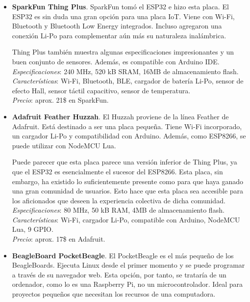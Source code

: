 \documentclass[12pt]{article}
\begin{document}
\begin{itemize}
		\item \textbf{SparkFun Thing Plus}. SparkFun tomó el ESP32 e hizo esta placa. El ESP32 es sin duda una gran opción para una placa IoT. Viene con Wi-Fi, Bluetooth y Bluetooth Low Energy integrados. Incluso agregaron una conexión Li-Po para complementar aún más su naturaleza inalámbrica.
		
		Thing Plus también muestra algunas especificaciones impresionantes y un buen conjunto de sensores. Además, es compatible con Arduino IDE. \\
		
		\textit{Especificaciones}: 240 MHz, 520 kB SRAM, 16MB de almacenamiento flash. \\
		
		\textit{Características}: Wi-Fi, Bluetooth, BLE, cargador de batería Li-Po, sensor de efecto Hall, sensor táctil capacitivo, sensor de temperatura. \\
		
		\textit{Precio}: aprox. 21\$ en SparkFun.\\
		
		\item \textbf{Adafruit Feather Huzzah}. El Huzzah proviene de la línea Feather de Adafruit. Está destinado a ser una placa pequeña. Tiene Wi-Fi incorporado, un cargador Li-Po y compatibilidad con Arduino. Además, como ESP8266, se puede utilizar con NodeMCU Lua.
		
		Puede parecer que esta placa parece una versión inferior de Thing Plus, ya que el ESP32 es esencialmente el sucesor del ESP8266. Esta placa, sin embargo, ha existido lo suficientemente presente como para que haya ganado una gran comunidad de usuarios. Esto hace que esta placa sea accesible para los aficionados que deseen la experiencia colectiva de dicha comunidad. \\
		
		\textit{Especificaciones}: 80 MHz, 50 kB RAM, 4MB de almacenamiento flash. \\
		
		\textit{Características}: Wi-Fi, cargador Li-Po, compatible con Arduino, NodeMCU Lua, 9 GPIO.\\
		
		\textit{Precio}: aprox. 17\$ en Adafruit.\\
		
		\item \textbf{BeagleBoard PocketBeagle}. El PocketBeagle es el más pequeño de los BeagleBoards. Ejecuta Linux desde el primer momento y se puede programar a través de su navegador web. Esta opción, por tanto, se trataría de un ordenador, como lo es una Raspberry Pi, no un microcontrolador. Ideal para proyectos pequeños que necesitan los recursos de una computadora. 
		

\end{itemize}
\end{document}
